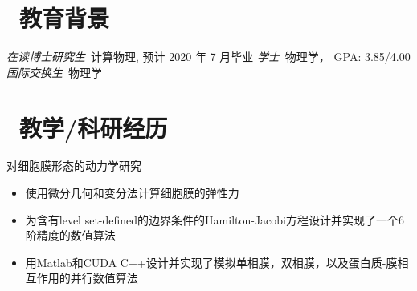 \documentclass{resume}
\begin{document}


 
\section{\faGraduationCap\  教育背景}
\textit{在读博士研究生}\ 计算物理, 预计 2020 年 7 月毕业
\textit{学士}\ 物理学， GPA: 3.85/4.00
\textit{国际交换生}\ 物理学

\section{\faFlask\ 教学/科研经历}



\begin{onehalfspacing}
对细胞膜形态的动力学研究
\begin{itemize}
  \item 使用微分几何和变分法计算细胞膜的弹性力
  \item 为含有level set-defined的边界条件的Hamilton-Jacobi方程设计并实现了一个6阶精度的数值算法
  \item 用Matlab和CUDA C++设计并实现了模拟单相膜，双相膜，以及蛋白质-膜相互作用的并行数值算法
\end{itemize}
\end{onehalfspacing}
\end{document}

